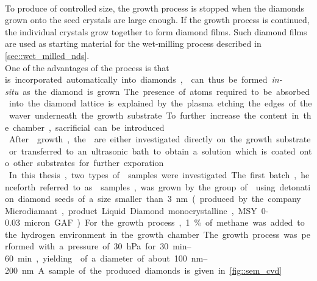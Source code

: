 	\\
	To produce \nds of controlled size, the growth process is stopped when the diamonds grown onto the seed crystals are large enough.
	If the growth process is continued, the individual crystals grow together to form diamond films.
	Such diamond films are used as starting material for the wet-milling process described in \autoref{sec::wet_milled_nds}.
	\\
	One of the advantages of the \CVD process is that \si is incorporated automatically into diamonds, \sivs can thus be formed \textit{in-situ} as the diamond is grown. The presence of \si atoms required to be absorbed into the diamond lattice is explained by the plasma etching the edges of the \si waver underneath the growth substrate.
	To further increase the \si content in the chamber, sacrificial \si can be introduced.
	\\
	After \nd growth, the \nds are either investigated directly on the growth substrate or transferred to an ultrasonic bath to obtain a solution which is coated onto other substrates for further exporation.
	\\
	In this thesis, two types of \nds samples were investigated.
	The first batch, henceforth referred to as \CVD samples, was grown by the group of \schreck using detonation diamond seeds of a size smaller than \SI{3}{nm}(produced by the company Microdiamant, product Liquid Diamond monocrystalline, MSY {0-0.03} micron GAF).
	For the growth process, \SI{1}{\percent} of methane was added to the hydrogen environment in the growth chamber.
	The growth process was performed with a pressure of \SI{30}{hPa} for \SIrange{30}{60}{min}, yielding \nds of a diameter of about \SIrange{100}{200}{nm}. A sample of the produced diamonds is given in \autoref{fig::sem_cvd}.
	\\


